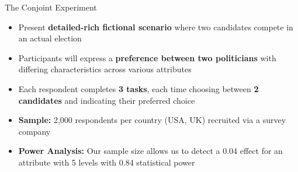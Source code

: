 \documentclass[9pt, aspectratio=169]{beamer}
\newcommand{\customcite}[1]{\textcolor{blue}{\footnotesize\parencite{#1}}}
\begin{document}
\begin{frame}{The Conjoint Experiment}
    \begin{itemize}
        \item Present \textbf{detailed-rich fictional scenario} where two candidates compete in an actual election \customcite{Galasso} \vspace{0.3cm}
        \item Participants will express a \textbf{preference between two politicians} with differing characteristics across various attributes \vspace{0.3cm}
        \item Each respondent completes \textbf{3 tasks}, each time choosing between \textbf{2 candidates} and indicating their preferred choice \vspace{0.3cm}
        \item \textbf{Sample:} 2,000 respondents per country (USA, UK) recruited via a survey company \vspace{0.3cm}
        \item \textbf{Power Analysis:} Our sample size allows us to detect a 0.04 effect for an attribute with 5 levels with 0.84 statistical power \customcite{lukac_stefanelli_2020}
    \end{itemize}
\end{frame}


\end{document}
